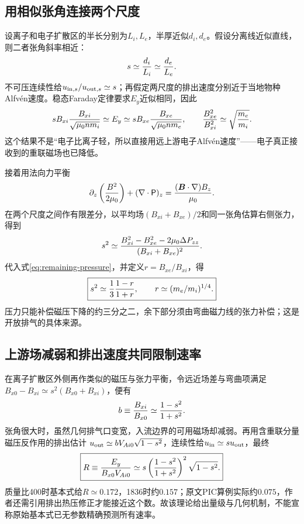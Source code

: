 \subsection{用相似张角连接两个尺度}
设离子和电子扩散区的半长分别为$L_i,L_e$，半厚近似$d_i,d_e$。假设分离线近似直线，则二者张角斜率相近：
\begin{equation}
 s\simeq{d_i\over L_i}\simeq{d_e\over L_e}.
\end{equation}
不可压连续性给$u_{{\rm in},s}/u_{{\rm out},s}\simeq s$；再假定两尺度的排出速度分别近于当地物种Alfvén速度。稳态Faraday定律要求$E_y$近似相同，因此
\begin{equation}
 s B_{xi}{B_{xi}\over\sqrt{\mu_0nm_i}}
 \simeq E_y\simeq
 s B_{xe}{B_{xe}\over\sqrt{\mu_0nm_e}},
 \qquad {B_{xe}^2\over B_{xi}^2}\simeq\sqrt{m_e\over m_i}.
 \label{eq:remaining-field-ratio}
\end{equation}
这个结果不是“电子比离子轻，所以直接用远上游电子Alfvén速度”——电子真正接收到的重联磁场也已降低。

接着用法向力平衡
\begin{equation}
 \partial_z\left({B^2\over2\mu_0}\right)+(\nabla\cdot\mathsf P)_z
 ={(\bm{B}\cdot\nabla)B_z\over\mu_0}.
\end{equation}
在两个尺度之间作有限差分，以平均场$(B_{xi}+B_{xe})/2$和同一张角估算右侧张力，得到
\begin{equation}
 s^2\simeq{B_{xi}^2-B_{xe}^2-2\mu_0\Delta P_{zz}\over(B_{xi}+B_{xe})^2}.
\end{equation}
代入式\eqref{eq:remaining-pressure}，并定义$r=B_{xe}/B_{xi}$，得
\begin{equation}
 \boxed{s^2\simeq{1\over3}{1-r\over1+r},\qquad
 r\simeq(m_e/m_i)^{1/4}.}
\end{equation}
压力只能补偿磁压下降的约三分之二，余下部分须由弯曲磁力线的张力补偿；这是开放排气的具体来源。

\subsection{上游场减弱和排出速度共同限制速率}
在离子扩散区外侧再作类似的磁压与张力平衡，令远近场差与弯曲项满足
$B_{x0}-B_{xi}\simeq s^2(B_{x0}+B_{xi})$，便有
\begin{equation}
 b\equiv{B_{xi}\over B_{x0}}\simeq{1-s^2\over1+s^2}.
\end{equation}
张角很大时，虽然几何排气口变宽，入流边界的可用磁场却减弱。再用含重联分量磁压反作用的排出估计
$u_{\rm out}\simeq bV_{Ai0}\sqrt{1-s^2}$，连续性给$u_{\rm in}\simeq s u_{\rm out}$，最终
\begin{equation}
 \boxed{R\equiv{E_y\over B_{x0}V_{Ai0}}
 \simeq s\left({1-s^2\over1+s^2}\right)^2\sqrt{1-s^2}.}
 \label{eq:remaining-rate}
\end{equation}
质量比400时基本式给$R\simeq0.172$，1836时约$0.157$；原文PIC算例实际约$0.075$，作者还需引用排出热压修正才能接近这个数。故该理论给出量级与几何机制，不能宣称原始基本式已无参数精确预测所有速率\citep{F589}。

